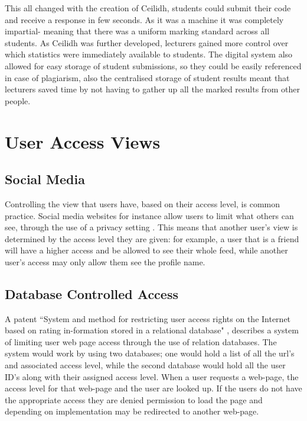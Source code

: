 \documentclass[11pt]{report}
\begin{document}
This all changed with the creation of Ceilidh, students could submit their code and receive a response in few seconds. As it was a machine it was completely impartial- meaning that there was a uniform marking standard across all students. As Ceilidh was further developed, lecturers gained more control over which statistics were immediately available to students. The digital system also allowed for easy storage of student submissions, so they could be easily referenced in case of plagiarism, also the centralised storage of student results meant that lecturers saved time by not having to gather up all the marked results from other people. 






\section{User Access Views}

\subsection{Social Media}
Controlling the view that users have, based on their access level, is common practice. Social media websites for instance allow users to limit what others can see, through the use of a privacy setting \cite{tufekci_can_2008-5}. This means that another user's view is determined by the access level they are given: for example, a user that is a friend will have a higher access and be allowed to see their whole feed, while another user's access may only allow them see the profile name.

\subsection{Database Controlled Access}
A patent ``System and method for restricting user access rights on the Internet based on rating in-formation stored in a relational database" \cite{baker_system_1997-1}, describes a system of limiting user web page access through the use of relation databases. The system would work by using two databases; one would hold a list of all the url's and associated access level, while the second database would hold all the user ID's along with their assigned access level. When a user requests a web-page, the access level for that web-page and the user are looked up. If the users do not have the appropriate access they are denied permission to load the page and depending on implementation may be redirected to another web-page.
\end{document}
